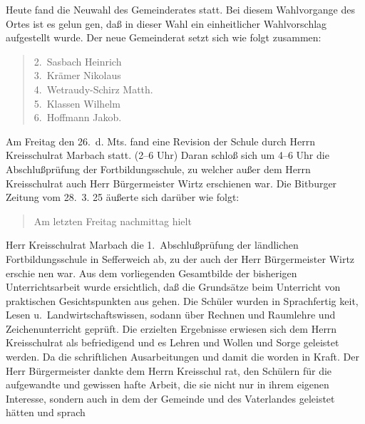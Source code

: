 

%
    Heute fand die Neuwahl des Gemeinderates statt.\ob
Bei diesem Wahlvorgange des Ortes ist es gelun\ohb
gen, daß in dieser Wahl ein einheitlicher Wahlvorschlag\ob
aufgestellt wurde. Der neue Gemeinderat setzt sich wie\ob
folgt zusammen:

\pend
{}
\pstart


\pend
\begin{verse}
2.\ Sasbach Heinrich\\
3.\ Krämer Nikolaus\\
4.\ Wetraudy-Schirz Matth.\\
5.\ Klassen Wilhelm\\
6.\ Hoffmann Jakob.
\end{verse}
\pstart

%
Am Freitag den 26.\ d. Mts. fand eine Revision der\ob
Schule durch Herrn Kreisschulrat Marbach statt. (2--6 Uhr)\ob
Daran schloß sich um 4--6 Uhr die Abschlußprüfung\ob
der Fortbildungsschule, zu welcher außer dem Herrn\ob
Kreisschulrat auch Herr Bürgermeister Wirtz erschienen\ob
war. Die Bitburger Zeitung vom 28.\ 3. 25 äußerte sich\ob
darüber wie folgt:


\pend
\begin{verse}
Am letzten Freitag nachmittag hielt
\end{verse}
\pstart
Herr Kreisschulrat Marbach die 1.\ Abschlußprüfung\ob
der ländlichen Fortbildungsschule in Sefferweich ab,\ob
zu der auch der Herr Bürgermeister Wirtz erschie\ohb
nen war. Aus dem vorliegenden Gesamtbilde der bisherigen\ob
Unterrichtsarbeit wurde ersichtlich, daß die Grundsätze\ob
beim Unterricht von praktischen Gesichtspunkten aus\ohb
gehen. Die Schüler wurden in Sprachfertig\ohb
keit, Lesen u.\ Landwirtschaftswissen, sodann\ob
über Rechnen und Raumlehre und Zeichenunterricht geprüft. Die\ob
erzielten Ergebnisse erwiesen sich dem Herrn Kreisschulrat\ob
als befriedigend und es\unsicher{} Lehren und Wollen\unsicher\ob
und Sorge geleistet werden. Da die schriftlichen\ob
Ausarbeitungen und damit\unsicher{} die\unsicher{} worden in\ob
Kraft. Der Herr Bürgermeister dankte dem Herrn Kreisschul\ohb
rat, den Schülern für die aufgewandte und gewissen\ohb
hafte Arbeit, die sie nicht nur in ihrem eigenen\ob
Interesse, sondern auch in dem der Gemeinde\ob
und des Vaterlandes geleistet hätten und sprach
\pend
